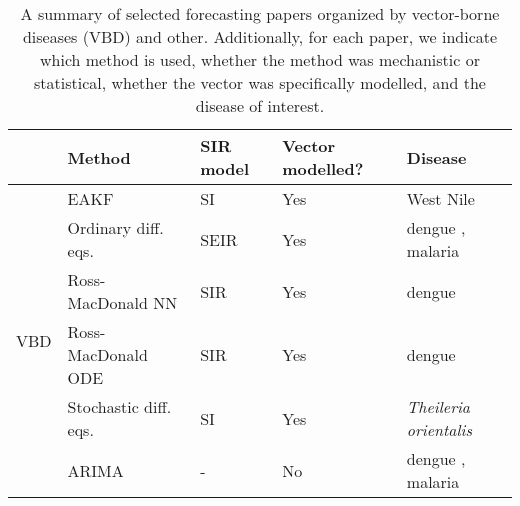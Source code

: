 \documentclass[a4paper]{article}
\begin{document}
\begin{table}[htp]
\caption{
A summary of selected forecasting papers organized by vector-borne diseases (VBD) and other. Additionally, for each paper, we indicate which method is used, whether the method was mechanistic or statistical, whether the vector was specifically modelled, and the disease of interest.
}
\begin{center}
\begin{tabular}{l|l|p{1cm}|p{1.8cm}|l}
  & \textbf{Method} & \textbf{SIR model} & \textbf{Vector modelled?} & \textbf{Disease} \\
\hline

\multirow{12}{*}{VBD} 
 & EAKF & SI & Yes & West Nile \cite{Defelice2017} \\
 & Ordinary diff. eqs. & SEIR & Yes & dengue \cite{lourencco20142012}, malaria \cite{tompkins2019dynamical} \\
 & Ross-MacDonald NN & SIR & Yes & dengue \cite{Dinh2016} \\
 & Ross-MacDonald ODE & SIR & Yes & dengue \cite{Amaku2016,Zhu2018} \\
  & Stochastic diff. eqs. & SI & Yes & {\em Theileria orientalis} \cite{jewell2015bayesian} \\
& ARIMA & - & No & dengue \cite{Johansson2016}, malaria \cite{Anwar2016,Zinszer2015} \\


\end{tabular}
\end{center}
\end{table}
\end{document}
